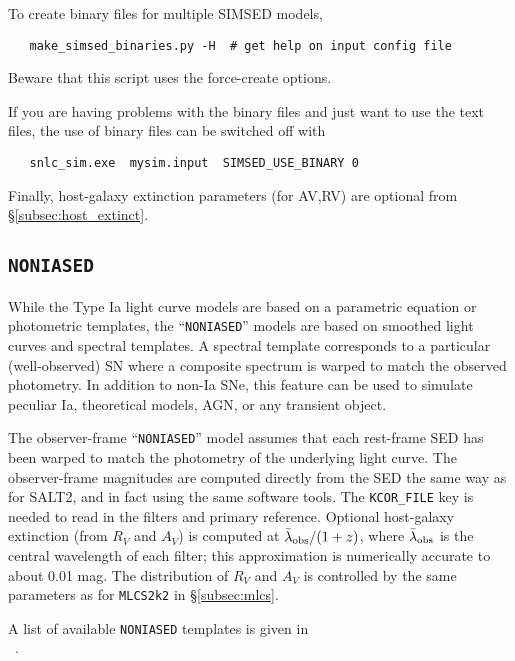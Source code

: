 \documentclass[12pt]{article}
\newcommand{\mlcs}{{\tt MLCS2k2}}
\newcommand{\NONIA}{{\tt NONIASED}}
\newcommand{\lamobs}{\lambda_{\rm obs}}
\begin{document}
To create binary files for multiple SIMSED models,
\vspace{-2mm}
\begin{verbatim}
   make_simsed_binaries.py -H  # get help on input config file
\end{verbatim}
\vspace{-2mm}
Beware that this script uses the force-create options.

If you are having problems with the binary files and just
want to use the text files, the use of binary files can
be switched off with
\begin{verbatim}
   snlc_sim.exe  mysim.input  SIMSED_USE_BINARY 0
\end{verbatim}

Finally, host-galaxy extinction parameters (for AV,RV) 
are optional from \S\ref{subsec:host_extinct}.

\clearpage
\subsection{\NONIA}
\label{subsec:NON1A}

While the Type Ia light curve models are based on
a parametric equation or photometric templates, 
the ``{\NONIA}'' models are based on smoothed 
light curves and spectral templates.  
A spectral template corresponds to a particular (well-observed)
SN where a composite spectrum is warped to match
the observed photometry.
In addition to non-Ia SNe, this feature can be used to
simulate peculiar Ia, theoretical models, AGN, or any
transient object.


The observer-frame ``{\NONIA}'' model assumes that each
rest-frame SED has been warped to match the photometry of the
underlying light curve. The observer-frame magnitudes are
computed directly from the SED the same way as for SALT2,
and in fact using the same software tools.
The {\tt KCOR\_FILE} key is needed 
to read in the filters and primary reference. 
Optional host-galaxy extinction (from $R_V$ and $A_V$) is computed at 
$\bar\lamobs/(1+z)$, where $\bar\lamobs$ is the central wavelength 
of each filter;
this approximation is numerically accurate to about 0.01 mag.
The distribution of $R_V$ and $A_V$ is controlled by the
same parameters as for {\mlcs} in \S\ref{subsec:mlcs}.



A list of available {\NONIA} templates is given in \\
\indent{}~. \\
\end{document}
